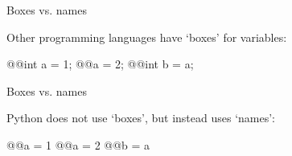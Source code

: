 \documentclass[xetex,10pt]{beamer}
\def\imgpath{../00-img/}
\def\spacer{\vspace*{1em}}
\begin{document}
\begin{frame}[fragile]{Boxes vs. names}
	
	Other programming languages have `boxes' for variables:
	
	\spacer

	\begin{python}
	@@int a = 1;
	@@a = 2;
	@@int b = a;
	\end{python}
	
	\spacer
	
	\begin{center}
	\end{center}
\end{frame}

\begin{frame}[fragile]{Boxes vs. names}
	
	Python does not use `boxes', but instead uses `names':

	\spacer

	\begin{python}
	@@a = 1
	@@a = 2
	@@b = a
	\end{python}
	
	\spacer
	
	\begin{center}
	\end{center}
\end{frame}
\end{document}
